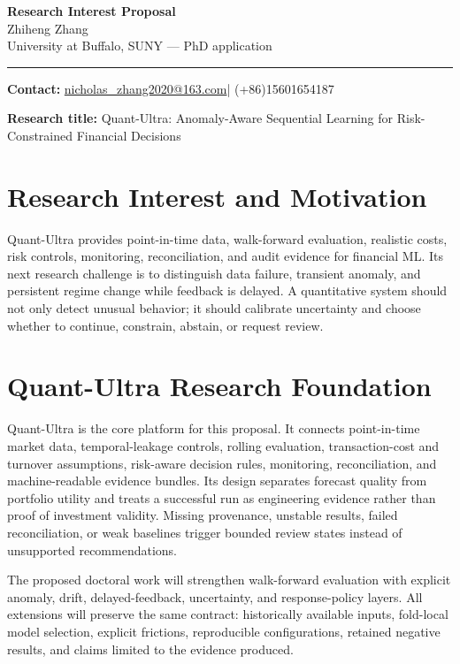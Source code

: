 \documentclass[11pt]{article}
\makeatletter
\newcommand{\ApplicantName}{Zhiheng Zhang}
\newcommand{\ApplicantEmail}{\href{mailto:nicholas_zhang2020@163.com}{nicholas\_zhang2020@163.com}}
\newcommand{\ApplicantPhone}{(+86)15601654187}
\makeatother
\begin{document}
\begin{center}
{\LARGE\bfseries Research Interest Proposal}\\[0.25em]
{\large \ApplicantName}\\
University at Buffalo, SUNY --- PhD application
\end{center}
\vspace{0.35em}\hrule\vspace{0.65em}

\setlength{\parskip}{0.45em}
\textbf{Contact:} \ApplicantEmail\quad | \quad \ApplicantPhone

\textbf{Research title:} Quant-Ultra: Anomaly-Aware Sequential Learning for Risk-Constrained Financial Decisions

\section*{Research Interest and Motivation}
Quant-Ultra provides point-in-time data, walk-forward evaluation, realistic costs, risk controls, monitoring, reconciliation, and audit evidence for financial ML. Its next research challenge is to distinguish data failure, transient anomaly, and persistent regime change while feedback is delayed. A quantitative system should not only detect unusual behavior; it should calibrate uncertainty and choose whether to continue, constrain, abstain, or request review.

\section*{Quant-Ultra Research Foundation}
Quant-Ultra is the core platform for this proposal. It connects point-in-time market data, temporal-leakage controls, rolling evaluation, transaction-cost and turnover assumptions, risk-aware decision rules, monitoring, reconciliation, and machine-readable evidence bundles. Its design separates forecast quality from portfolio utility and treats a successful run as engineering evidence rather than proof of investment validity. Missing provenance, unstable results, failed reconciliation, or weak baselines trigger bounded review states instead of unsupported recommendations.

The proposed doctoral work will strengthen walk-forward evaluation with explicit anomaly, drift, delayed-feedback, uncertainty, and response-policy layers. All extensions will preserve the same contract: historically available inputs, fold-local model selection, explicit frictions, reproducible configurations, retained negative results, and claims limited to the evidence produced.
\end{document}

